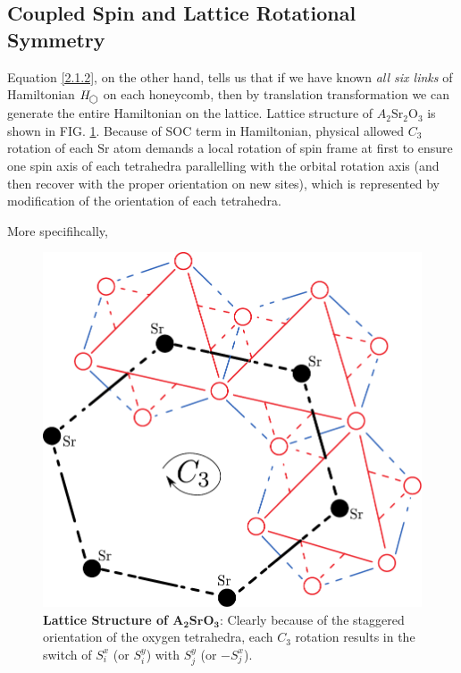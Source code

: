 \documentclass[10pt,nofootinbib]{revtex4}
\newcommand\hexagon{\mathop{\begin{tikzpicture}[scale=0.06,baseline]
		\draw (0,-1) -- (1.732,0) -- (1.732,2) -- (0,3) -- (-1.732,2) -- (-1.732,0) -- (0,-1);
	\end{tikzpicture}}}
\begin{document}
		\subsection{Coupled Spin and Lattice Rotational Symmetry}
			Equation \eqref{2.1.2}, on the other hand, tells us that if we have known \emph{all six links} of Hamiltonian $H_{\hexagon}$ on each honeycomb, then by translation transformation we can generate the entire Hamiltonian on the lattice.
			Lattice structure of $A_2\mathrm{Sr_2O_3}$ is shown in FIG. \ref{fig:A2SrO3}. Because of SOC term in Hamiltonian, physical allowed $C_3$ rotation of each $\mathrm{Sr}$ atom demands a local rotation of spin frame at first to ensure one spin axis of each tetrahedra parallelling with the orbital rotation axis (and then recover with the proper orientation on new sites), which is represented by modification of the orientation of each tetrahedra.\par
			More specifihcally, 
			\begin{figure}[!htp]
				\centering
				\includegraphics[scale=0.7]{A2SrO3.pdf}
				\caption{{\bf Lattice Structure of $\mathbf{A_2SrO_3}$}: Clearly because of the staggered orientation of the oxygen tetrahedra, each $C_3$ rotation results in the switch of $S_i^x$ (or $S_i^y$) with $S_j^y$ (or $-S_j^x$).}
				\label{fig:A2SrO3}
			\end{figure}
\fi
\end{document}
